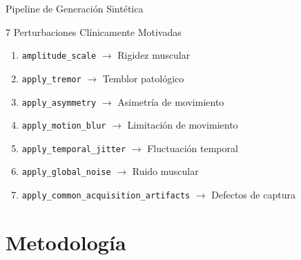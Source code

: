 \documentclass[aspectratio=169]{beamer}
\begin{document}
\begin{frame}{Pipeline de Generación Sintética}
\begin{center}
\end{center}

\vspace{0.5cm}

\begin{block}{7 Perturbaciones Clínicamente Motivadas}
\begin{enumerate}
\item \texttt{amplitude\_scale} $\rightarrow$ Rigidez muscular
\item \texttt{apply\_tremor} $\rightarrow$ Temblor patológico
\item \texttt{apply\_asymmetry} $\rightarrow$ Asimetría de movimiento
\item \texttt{apply\_motion\_blur} $\rightarrow$ Limitación de movimiento
\item \texttt{apply\_temporal\_jitter} $\rightarrow$ Fluctuación temporal
\item \texttt{apply\_global\_noise} $\rightarrow$ Ruido muscular
\item \texttt{apply\_common\_acquisition\_artifacts} $\rightarrow$ Defectos de captura
\end{enumerate}
\end{block}
\end{frame}

\section{Metodología}
\end{document}
